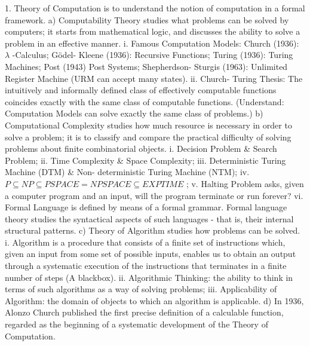 \documentclass[10pt,a4paper]{article}
\begin{document}
1. Theory of Computation is to understand the notion of computation in a formal framework.
a) Computability Theory studies what problems can be solved by computers; it starts from mathematical logic, and discusses the ability to solve a problem in an effective manner.
    i. Famous Computation Models: Church (1936): \(\lambda\) -Calculus; Gödel- Kleene (1936): Recursive Functions; Turing (1936): Turing Machines; Post (1943) Post Systems; Shepherdson- Sturgis (1963): Unlimited Register Machine (URM can accept many states).
    ii. Church- Turing Thesis: The intuitively and informally defined class of effectively computable functions coincides exactly with the same class of computable functions. (Understand: Computation Models can solve exactly the same class of problems.)
b) Computational Complexity studies how much resource is necessary in order to solve a problem; it is to classify and compare the practical difficulty of solving problems about finite combinatorial objects.
    i. Decision Problem \& Search Problem;
    ii. Time Complexity \& Space Complexity;
    iii. Deterministic Turing Machine (DTM) \& Non- deterministic Turing Machine (NTM);
    iv. \(P\subseteq NP\subseteq PSPACE = NPSPACE\subseteq EXPTIME\) ;
    v. Halting Problem asks, given a computer program and an input, will the program terminate or run forever?
    vi. Formal Language is defined by means of a formal grammar. Formal language theory studies the syntactical aspects of such languages - that is, their internal structural patterns.
c) Theory of Algorithm studies how problems can be solved.
    i. Algorithm is a procedure that consists of a finite set of instructions which, given an input from some set of possible inputs, enables us to obtain an output through a systematic execution of the instructions that terminates in a finite number of steps (A blackbox).
    ii. Algorithmic Thinking: the ability to think in terms of such algorithms as a way of solving problems;
    iii. Applicability of Algorithm: the domain of objects to which an algorithm is applicable.
d) In 1936, Alonzo Church published the first precise definition of a calculable function, regarded as the beginning of a systematic development of the Theory of Computation.
\end{document}
